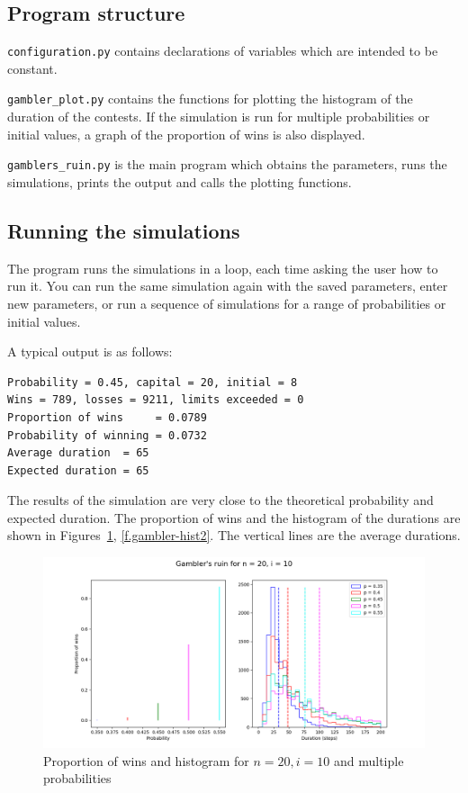 \subsection{Program structure}

\verb+configuration.py+ contains declarations of variables which are intended to be constant.

\verb+gambler_plot.py+ contains the functions for plotting the histogram of the duration of the contests. If the simulation is run for multiple probabilities or initial values, a graph of the proportion of wins is also displayed.

\verb+gamblers_ruin.py+ is the main program which obtains the parameters, runs the simulations, prints the output and calls the plotting functions.

\subsection{Running the simulations}

The program runs the simulations in a loop, each time asking the user how to run it. You can run the same simulation again with the saved parameters, enter new parameters, or run a sequence of simulations for a range of probabilities or initial values.

A typical output is as follows:
\begin{verbatim}
Probability = 0.45, capital = 20, initial = 8
Wins = 789, losses = 9211, limits exceeded = 0
Proportion of wins     = 0.0789
Probability of winning = 0.0732
Average duration  = 65
Expected duration = 65
\end{verbatim}
The results of the simulation are very close to the theoretical probability and expected duration. The proportion of wins and the histogram of the durations are shown in Figures~\ref{f.gambler-hist1}, \ref{f.gambler-hist2}. The vertical lines are the average durations.

\begin{figure}
\begin{center}
\includegraphics[width=\textwidth]{gamblers_ruin-01}
\caption{Proportion of wins and histogram for $n=20, i=10$ and multiple probabilities}\label{f.gambler-hist1}
\end{center}
\end{figure}

